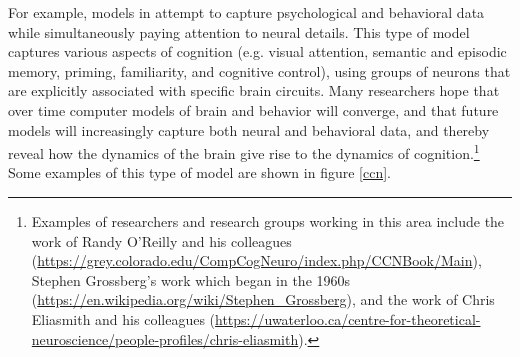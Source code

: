 For example, models in  attempt to capture psychological and behavioral data while simultaneously paying attention to neural details. This type of model captures various aspects of cognition (e.g. visual attention, semantic and episodic memory, priming, familiarity, and cognitive control), using groups of neurons that are explicitly associated with specific brain circuits. Many researchers hope that over time computer models of brain and behavior will converge, and that future models will increasingly capture both neural and behavioral data, and thereby reveal how the dynamics of the brain give rise to the dynamics of cognition.\footnote{Examples of researchers and research groups working in this area include the work of Randy O'Reilly and his colleagues (\url{https://grey.colorado.edu/CompCogNeuro/index.php/CCNBook/Main}), Stephen Grossberg's work which began in the 1960s (\url{https://en.wikipedia.org/wiki/Stephen_Grossberg}), and the work of Chris Eliasmith and his colleagues (\url{https://uwaterloo.ca/centre-for-theoretical-neuroscience/people-profiles/chris-eliasmith}).} Some examples of this type of model are shown in figure \ref{ccn}.

